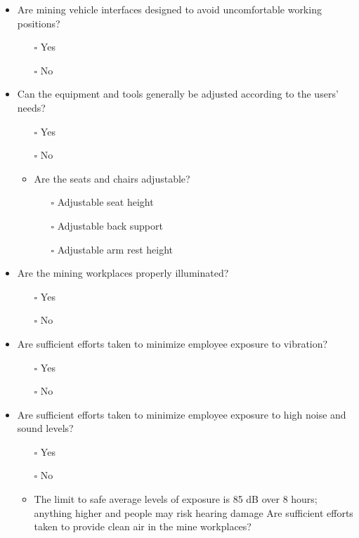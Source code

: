 \documentclass[
  12pt,
]{scrbook}
\providecommand{\tightlist}{%
  \setlength{\itemsep}{0pt}\setlength{\parskip}{0pt}}
\begin{document}
\begin{itemize}
\item
  Are mining vehicle interfaces designed to avoid uncomfortable working positions?

  \begin{itemize}
  \tightlist
  \item[$\square$]
    Yes
  \item[$\square$]
    No
  \end{itemize}
\item
  Can the equipment and tools generally be adjusted according to the users' needs?

  \begin{itemize}
  \item[$\square$]
    Yes
  \item[$\square$]
    No
  \item
    Are the seats and chairs adjustable?

    \begin{itemize}
    \tightlist
    \item[$\square$]
      Adjustable seat height
    \item[$\square$]
      Adjustable back support
    \item[$\square$]
      Adjustable arm rest height
    \end{itemize}
  \end{itemize}
\item
  Are the mining workplaces properly illuminated?

  \begin{itemize}
  \tightlist
  \item[$\square$]
    Yes
  \item[$\square$]
    No
  \end{itemize}
\item
  Are sufficient efforts taken to minimize employee exposure to vibration?

  \begin{itemize}
  \tightlist
  \item[$\square$]
    Yes
  \item[$\square$]
    No
  \end{itemize}
\item
  Are sufficient efforts taken to minimize employee exposure to high noise and sound levels?

  \begin{itemize}
  \item[$\square$]
    Yes
  \item[$\square$]
    No
  \item
    The limit to safe average levels of exposure is 85 dB over 8 hours; anything higher and people may risk hearing damage Are sufficient efforts taken to provide clean air in the mine workplaces?


\end{itemize}
\end{itemize}
\end{document}
